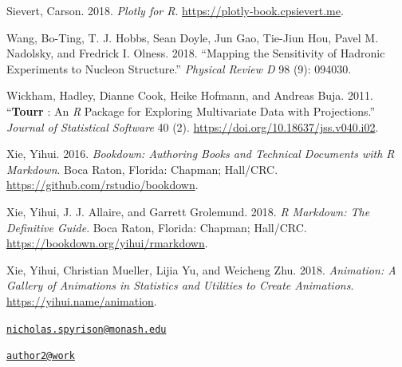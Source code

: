 \leavevmode\hypertarget{ref-sievert_plotly_2018}{}%
Sievert, Carson. 2018. \emph{Plotly for R}. \url{https://plotly-book.cpsievert.me}.

\leavevmode\hypertarget{ref-wang_mapping_2018}{}%
Wang, Bo-Ting, T. J. Hobbs, Sean Doyle, Jun Gao, Tie-Jiun Hou, Pavel M. Nadolsky, and Fredrick I. Olness. 2018. ``Mapping the Sensitivity of Hadronic Experiments to Nucleon Structure.'' \emph{Physical Review D} 98 (9): 094030.

\leavevmode\hypertarget{ref-wickham_tourr_2011}{}%
Wickham, Hadley, Dianne Cook, Heike Hofmann, and Andreas Buja. 2011. ``\textbf{Tourr} : An \emph{R} Package for Exploring Multivariate Data with Projections.'' \emph{Journal of Statistical Software} 40 (2). \url{https://doi.org/10.18637/jss.v040.i02}.

\leavevmode\hypertarget{ref-xie_bookdown:_2016}{}%
Xie, Yihui. 2016. \emph{Bookdown: Authoring Books and Technical Documents with R Markdown}. Boca Raton, Florida: Chapman; Hall/CRC. \url{https://github.com/rstudio/bookdown}.

\leavevmode\hypertarget{ref-xie_r_2018}{}%
Xie, Yihui, J. J. Allaire, and Garrett Grolemund. 2018. \emph{R Markdown: The Definitive Guide}. Boca Raton, Florida: Chapman; Hall/CRC. \url{https://bookdown.org/yihui/rmarkdown}.

\leavevmode\hypertarget{ref-xie_animation:_2018}{}%
Xie, Yihui, Christian Mueller, Lijia Yu, and Weicheng Zhu. 2018. \emph{Animation: A Gallery of Animations in Statistics and Utilities to Create Animations}. \url{https://yihui.name/animation}.



\address{%
Nicholas Spyrison\\
Monash University\\
line 1\\ line 2\\
}
\href{mailto:nicholas.spyrison@monash.edu}{\nolinkurl{nicholas.spyrison@monash.edu}}

\address{%
Dianne Cook\\
Monash University\\
line 1\\ line 2\\
}
\href{mailto:author2@work}{\nolinkurl{author2@work}}

